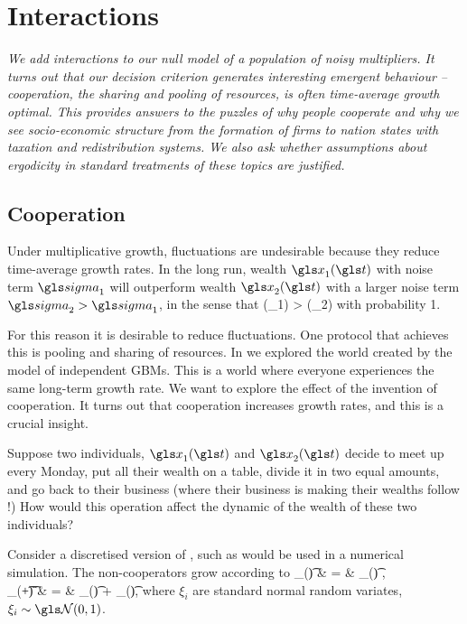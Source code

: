 

\chapter{Interactions}
{\it
We add interactions to our null model of a population of noisy multipliers. It turns out that our decision criterion generates interesting emergent behaviour -- cooperation, the sharing and pooling of resources, is often time-average 
growth optimal. This provides answers to the puzzles of why people cooperate and why we see socio-economic structure from the formation of firms to nation states with taxation and redistribution systems. We also ask whether assumptions about ergodicity in standard treatments of these topics are justified.}
\newpage



\section{Cooperation}
Under multiplicative growth, fluctuations are undesirable because they reduce 
time-average growth rates. In the long run, wealth $\x_1(\t)$ with noise term 
$\gsigma_1$ will outperform wealth $\x_2(\t)$ with a larger 
noise term $\gsigma_2>\gsigma_1$, in the sense that 
\be
\gt(\x_1) > \gt(\x_2)
\ee
with probability 1.

For this reason it is desirable to reduce fluctuations. One protocol that achieves this is pooling and sharing of resources. In  we explored the world created 
by the model of independent GBMs. This is a world where everyone experiences the 
same long-term growth rate. We want to explore the effect of the invention of 
cooperation. It turns out that cooperation increases growth rates, and this is a 
crucial insight. 

Suppose two individuals, $\x_1(\t)$ and $\x_2(\t)$ decide to meet up every Monday, put all their wealth on a table, divide it in two equal amounts, and go back to their business (where their business is making their wealths follow \GBM!) How 
would this operation affect the dynamic of the wealth of these two individuals?

Consider a discretised version of , such as would be used in a numerical simulation. The non-cooperators grow according to
 \bea
 \D \x_\gi(\t) & = & \x_\gi(\t) ,  \\
 \x_\gi(\t+\D\t) & = & \x_\gi(\t) + \D \x_\gi(\t), 
 \eea
 where $\xi_i$ are standard normal random variates, $\xi_i\sim \mathcal{\N}(0,1)$.

